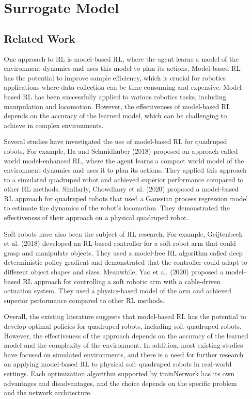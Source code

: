 \section{Surrogate Model}


\subsection{Related Work}

One approach to RL is model-based RL, where the agent learns a model of the environment dynamics and uses this model to plan its actions. Model-based RL has the potential to improve sample efficiency, which is crucial for robotics applications where data collection can be time-consuming and expensive. Model-based RL has been successfully applied to various robotics tasks, including manipulation and locomotion. However, the effectiveness of model-based RL depends on the accuracy of the learned model, which can be challenging to achieve in complex environments.

Several studies have investigated the use of model-based RL for quadruped robots. For example, Ha and Schmidhuber (2018) proposed an approach called world model-enhanced RL, where the agent learns a compact world model of the environment dynamics and uses it to plan its actions. They applied this approach to a simulated quadruped robot and achieved superior performance compared to other RL methods. Similarly, Chowdhary et al. (2020) proposed a model-based RL approach for quadruped robots that used a Gaussian process regression model to estimate the dynamics of the robot's locomotion. They demonstrated the effectiveness of their approach on a physical quadruped robot.

Soft robots have also been the subject of RL research. For example, Geijtenbeek et al. (2018) developed an RL-based controller for a soft robot arm that could grasp and manipulate objects. They used a model-free RL algorithm called deep deterministic policy gradient and demonstrated that the controller could adapt to different object shapes and sizes. Meanwhile, Yao et al. (2020) proposed a model-based RL approach for controlling a soft robotic arm with a cable-driven actuation system. They used a physics-based model of the arm and achieved superior performance compared to other RL methods.

Overall, the existing literature suggests that model-based RL has the potential to develop optimal policies for quadruped robots, including soft quadruped robots. However, the effectiveness of the approach depends on the accuracy of the learned model and the complexity of the environment. In addition, most existing studies have focused on simulated environments, and there is a need for further research on applying model-based RL to physical soft quadruped robots in real-world settings.
Each optimization algorithm supported by trainNetwork has its own advantages and disadvantages, and the choice depends on the specific problem and the network architecture. 

